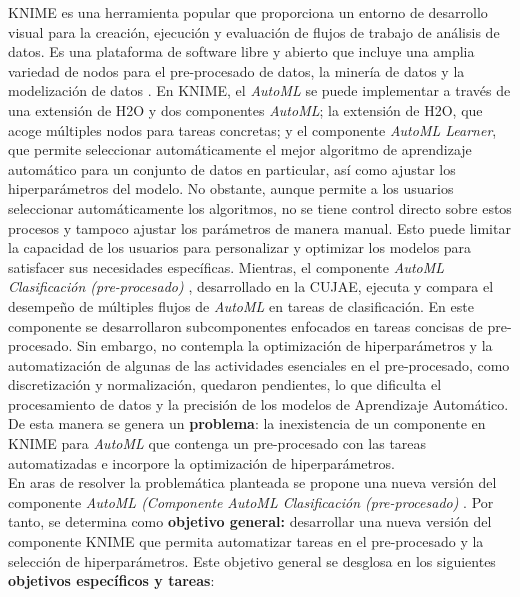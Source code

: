 KNIME es una herramienta popular que proporciona un entorno de desarrollo visual para la creación, ejecución y evaluación de flujos de trabajo de análisis de datos. Es una plataforma de software libre y abierto que incluye una amplia variedad de nodos para el pre-procesado de datos, la minería de datos y la modelización de datos \citep{knime2023}. En KNIME, el \textit{AutoML} se puede implementar a través de una extensión de H2O y dos componentes \textit{AutoML}; la extensión de H2O, que acoge múltiples nodos para tareas concretas; y el componente \textit{AutoML Learner}, que permite seleccionar automáticamente el mejor algoritmo de aprendizaje automático para un conjunto de datos en particular, así como ajustar los hiperparámetros del modelo. No obstante, aunque permite a los usuarios seleccionar automáticamente los algoritmos, no se tiene control directo sobre estos procesos y tampoco ajustar los parámetros de manera manual. Esto puede limitar la capacidad de los usuarios para personalizar y optimizar los modelos para satisfacer sus necesidades específicas. Mientras, el componente \textit{AutoML Clasificación (pre-procesado)} \citep{Carrazana2022}, desarrollado en la CUJAE, ejecuta y compara el desempeño de múltiples flujos de \textit{AutoML} en tareas de clasificación. En este componente se desarrollaron subcomponentes enfocados en tareas concisas de pre-procesado. Sin embargo, no contempla la optimización de hiperparámetros y la automatización de algunas de las actividades esenciales en el pre-procesado, como discretización y normalización, quedaron pendientes, lo que dificulta el procesamiento de datos y la precisión de los modelos de Aprendizaje Automático. De esta manera se genera un \textbf{problema}: la inexistencia de un componente en KNIME para \textit{AutoML} que contenga un pre-procesado con las tareas automatizadas e incorpore la optimización de hiperparámetros. \\
En aras de resolver la problemática planteada se propone una nueva versión del componente \textit{AutoML (Componente AutoML Clasificación (pre-procesado)} \citep{Carrazana2022}. Por tanto, se determina como \textbf{objetivo general:} desarrollar una nueva versión del componente KNIME que permita automatizar tareas en el pre-procesado y la selección de hiperparámetros. Este objetivo general se desglosa en los siguientes \textbf{objetivos específicos y tareas}:

